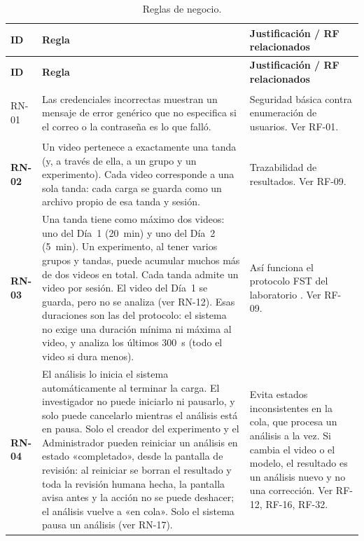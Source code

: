 \begin{longtable}{|>{\bfseries}p{1.1cm}|>{\raggedright}p{8.1cm}|>{\raggedright\arraybackslash}p{3.9cm}|}
\caption{Reglas de negocio.
\label{tab:rn}}\\
\hline
\textbf{ID} & \textbf{Regla} & \textbf{Justificación / RF relacionados} \\
\hline
\endfirsthead
\hline
\textbf{ID} & \textbf{Regla} & \textbf{Justificación / RF relacionados} \\
\hline
\endhead
\hline
\endfoot

RN-01 & Las credenciales incorrectas muestran un mensaje de error genérico que no
        especifica si el correo o la contraseña es lo que falló.
      & Seguridad básica contra enumeración de usuarios. Ver RF-01. \\
\hline
RN-02 & Un video pertenece a exactamente una tanda (y, a través de ella, a un
        grupo y un experimento). Cada video corresponde a una sola tanda: cada carga se guarda
        como un archivo propio de esa tanda y sesión.
      & Trazabilidad de resultados. Ver RF-09. \\
\hline
RN-03 & Una tanda tiene como máximo dos videos: uno del Día~1 (20~min) y uno del
        Día~2 (5~min). Un experimento, al tener varios grupos y tandas, puede
        acumular muchos más de dos videos en total. Cada tanda admite un video por sesión. El video del Día~1 se guarda, pero
        no se analiza (ver RN-12). Esas duraciones son las del protocolo: el sistema no exige
        una duración mínima ni máxima al video, y analiza los últimos 300~s (todo el video si dura menos).
      & Así funciona el protocolo FST del laboratorio \cite{slattery2012}. Ver RF-09. \\
\hline
RN-04 & El análisis lo inicia el sistema automáticamente al terminar la carga. El
        investigador no puede iniciarlo ni pausarlo, y solo puede cancelarlo mientras
        el análisis está en pausa. Solo el creador del experimento y el
        Administrador pueden reiniciar un análisis en estado «completado», desde la
        pantalla de revisión: al reiniciar se borran el resultado y toda la revisión
        humana hecha, la pantalla avisa antes y la acción no se puede deshacer; el
        análisis vuelve a «en cola».
        Solo el sistema pausa un análisis (ver RN-17).
      & Evita estados inconsistentes en la cola, que procesa un análisis a la vez. Si
        cambia el video o el modelo, el resultado es un análisis nuevo y no una
        corrección. Ver RF-12, RF-16, RF-32. \\

\end{longtable}
